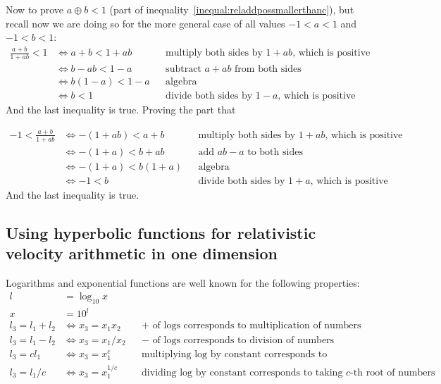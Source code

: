 \documentclass[a4paper]{article}
\theoremstyle{plain}
\theoremstyle{definition}
\begin{document}
Now to prove $a \oplus b < 1$ (part of
inequality~\eqref{inequal:reladdpossmallerthanc}), but recall now we
are doing so for the more general case of all values $-1 < a < 1$ and
$-1 < b < 1$:
\begin{align*}
\frac{a+b}{1+ab} < 1
  & \Leftrightarrow a+b < 1+ab & & \text{multiply both sides by $1+ab$, which is positive} \\
  & \Leftrightarrow b-ab < 1-a & & \text{subtract $a+ab$ from both sides} \\
  & \Leftrightarrow b(1-a) < 1-a & & \text{algebra} \\
  & \Leftrightarrow b < 1 & & \text{divide both sides by $1-a$, which is positive}
\end{align*}
And the last inequality is true.  Proving the part that

\begin{align*}
-1 < \frac{a+b}{1+ab}
  & \Leftrightarrow -(1+ab) < a+b & & \text{multiply both sides by $1+ab$, which is positive} \\
  & \Leftrightarrow -(1+a) < b+ab & & \text{add $ab-a$ to both sides} \\
  & \Leftrightarrow -(1+a) < b(1+a) & & \text{algebra} \\
  & \Leftrightarrow -1 < b & & \text{divide both sides by $1+a$, which is positive}
\end{align*}
And the last inequality is true.


\subsection{Using hyperbolic functions for relativistic velocity arithmetic in one dimension}
\label{app:1drelVelocityUsingHyperbolicFns}

Logarithms and exponential functions are well known for the following
properties:
\begin{align*}
l & = \log_{10} x \\
x & = 10^l \\
l_3 = l_1 + l_2 & \Leftrightarrow x_3 = x_1 x_2 & & \text{$+$ of logs corresponds to multiplication of numbers} \\
l_3 = l_1 - l_2 & \Leftrightarrow x_3 = x_1 / x_2 & & \text{$-$ of logs corresponds to division of numbers} \\
l_3 = c l_1 & \Leftrightarrow x_3 = x_1^c & & \text{multiplying log by constant corresponds to exponentiation of numbers} \\
l_3 = l_1/c & \Leftrightarrow x_3 = x_1^{1/c} & & \text{dividing log by constant corresponds to taking $c$-th root of numbers} \\
\end{align*}
\end{document}
